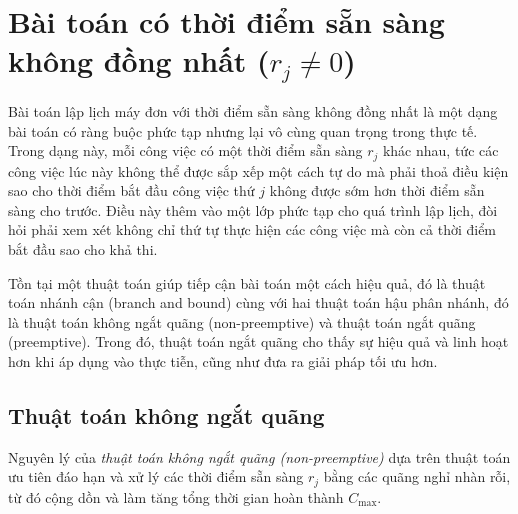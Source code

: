 \section{Bài toán có thời điểm sẵn sàng không đồng nhất ($r_j \neq 0$)}
Bài toán lập lịch máy đơn với thời điểm sẵn sàng không đồng nhất là một dạng bài toán có ràng buộc phức tạp nhưng lại vô cùng quan trọng trong thực tế. Trong dạng này, mỗi công việc có một thời điểm sẵn sàng $r_j$ khác nhau, tức các công việc lúc này không thể được sắp xếp một cách tự do mà phải thoả điều kiện sao cho thời điểm bắt đầu công việc thứ $j$ không được sớm hơn thời điểm sẵn sàng cho trước. Điều này thêm vào một lớp phức tạp cho quá trình lập lịch, đòi hỏi phải xem xét không chỉ thứ tự thực hiện các công việc mà còn cả thời điểm bắt đầu sao cho khả thi.

Tồn tại một thuật toán giúp tiếp cận bài toán một cách hiệu quả, đó là thuật toán nhánh cận (branch and bound) cùng với hai thuật toán hậu phân nhánh, đó là thuật toán không ngắt quãng (non-preemptive) và thuật toán ngắt quãng (preemptive). Trong đó, thuật toán ngắt quãng cho thấy sự hiệu quả và linh hoạt hơn khi áp dụng vào thực tiễn, cũng như đưa ra giải pháp tối ưu hơn.

\subsection*{Thuật toán không ngắt quãng}
Nguyên lý của \textit{thuật toán không ngắt quãng (non-preemptive)} dựa trên thuật toán ưu tiên đáo hạn và xử lý các thời điểm sẵn sàng $r_j$ bằng các quãng nghỉ nhàn rỗi, từ đó cộng dồn và làm tăng tổng thời gian hoàn thành $C_{\max}$.

